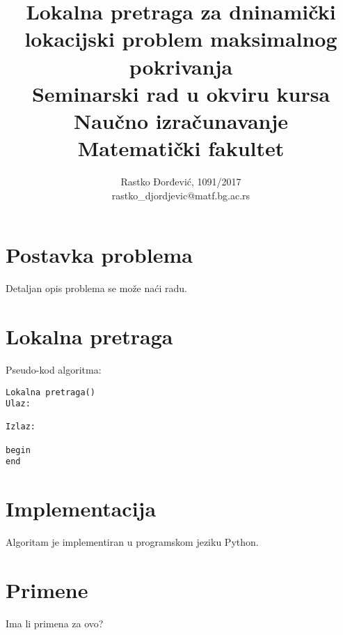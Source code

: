 \documentclass[a4paper]{article}
\begin{document}
\title{Lokalna pretraga za dninamički lokacijski problem maksimalnog pokrivanja\\ \small{Seminarski rad u okviru kursa\\Naučno izračunavanje\\ Matematički fakultet}}

\author{Rastko Đorđević, 1091/2017\\ rastko\_djordjevic@matf.bg.ac.rs}
\maketitle


\tableofcontents

\newpage



\section{Postavka problema}

Detaljan opis problema se može naći radu\cite{main_paper}.

\section{Lokalna pretraga}

Pseudo-kod algoritma:
\begin{verbatim}
Lokalna pretraga()
Ulaz:

Izlaz:

begin
end
\end{verbatim}


\section{Implementacija}

Algoritam je implementiran u programskom jeziku Python. 

\section{Primene}
Ima li primena za ovo?

\appendix
 

\end{document}
